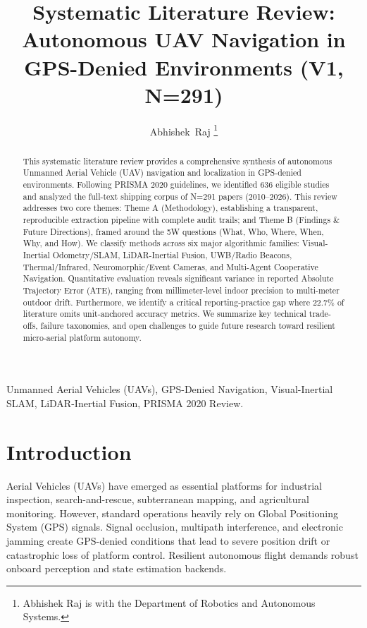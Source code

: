 \documentclass[journal,10pt,twocolumn]{IEEEtran}
\begin{document}
\title{Systematic Literature Review: Autonomous UAV Navigation in GPS-Denied Environments (V1, N=291)}

\author{Abhishek~Raj
\thanks{Abhishek Raj is with the Department of Robotics and Autonomous Systems.}}

\maketitle

\begin{abstract}
This systematic literature review provides a comprehensive synthesis of autonomous Unmanned Aerial Vehicle (UAV) navigation and localization in GPS-denied environments. Following PRISMA 2020 guidelines, we identified 636 eligible studies and analyzed the full-text shipping corpus of N=291 papers (2010--2026). This review addresses two core themes: Theme A (Methodology), establishing a transparent, reproducible extraction pipeline with complete audit trails; and Theme B (Findings \& Future Directions), framed around the 5W questions (What, Who, Where, When, Why, and How). We classify methods across six major algorithmic families: Visual-Inertial Odometry/SLAM, LiDAR-Inertial Fusion, UWB/Radio Beacons, Thermal/Infrared, Neuromorphic/Event Cameras, and Multi-Agent Cooperative Navigation. Quantitative evaluation reveals significant variance in reported Absolute Trajectory Error (ATE), ranging from millimeter-level indoor precision to multi-meter outdoor drift. Furthermore, we identify a critical reporting-practice gap where 22.7\% of literature omits unit-anchored accuracy metrics. We summarize key technical trade-offs, failure taxonomies, and open challenges to guide future research toward resilient micro-aerial platform autonomy.
\end{abstract}

\begin{IEEEkeywords}
Unmanned Aerial Vehicles (UAVs), GPS-Denied Navigation, Visual-Inertial SLAM, LiDAR-Inertial Fusion, PRISMA 2020 Review.
\end{IEEEkeywords}

\section{Introduction}
 Aerial Vehicles (UAVs) have emerged as essential platforms for industrial inspection, search-and-rescue, subterranean mapping, and agricultural monitoring. However, standard operations heavily rely on Global Positioning System (GPS) signals. Signal occlusion, multipath interference, and electronic jamming create GPS-denied conditions that lead to severe position drift or catastrophic loss of platform control. Resilient autonomous flight demands robust onboard perception and state estimation backends.
\end{document}

